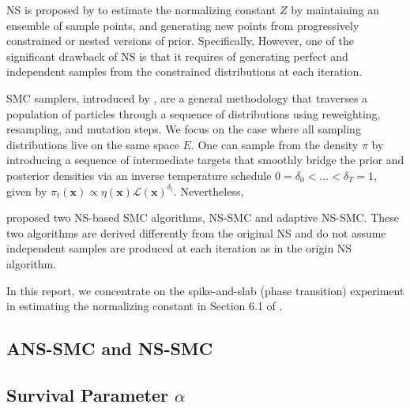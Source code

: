 \documentclass[11pt]{article}
\begin{document}
NS is proposed by \cite{10.1214/06-BA127} to estimate the normalizing constant $Z$  by maintaining an ensemble of sample points, and generating new points from progressively constrained or nested versions of prior. 
Specifically, 
However, one of the significant drawback of NS is that it requires of generating perfect and independent samples from the constrained distributions at each iteration. 

SMC samplers, introduced by \cite{10.1111/j.1467-9868.2006.00553.x}, are a general methodology that traverses a population of particles through a sequence of distributions using reweighting, resampling, and mutation steps. 
We focus on the case where all sampling distributions live on the same space $E$. 
One can sample from the density $\pi$ by introducing a sequence of intermediate targets that smoothly bridge the prior and posterior densities via an inverse temperature schedule $0 = \delta_0 < \dots < \delta_T = 1$, given by $\pi_t(\mathbf{x}) \propto \eta(\mathbf{x})\mathcal{L}(\mathbf{x})^{\delta_t}$.
Nevertheless, 

\cite{10.1093/jrsssb/qkaf015} proposed two NS-based SMC algorithms, NS-SMC and adaptive NS-SMC. 
These two algorithms are derived differently from the original NS and do not assume independent samples are produced at each iteration as in the origin NS algorithm.

In this report, we concentrate on the spike-and-slab (phase transition) experiment in estimating the normalizing constant in Section 6.1 of \cite{10.1093/jrsssb/qkaf015}.

\subsection{ANS-SMC and NS-SMC}

\subsection{Survival Parameter $\alpha$}
\end{document}
